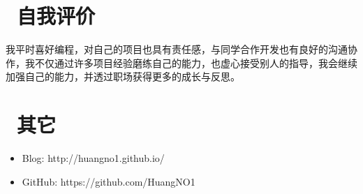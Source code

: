 \documentclass[11pt, a4paper]{article}
\begin{document}


\section{\color{CVBlue}\faChalkboard\ 自我评价}

\quad\quad 我平时喜好编程，对自己的项目也具有责任感，与同学合作开发也有良好的沟通协作，我不仅通过许多项目经验磨练自己的能力，也虚心接受别人的指导，我会继续加强自己的能力，并透过职场获得更多的成长与反思。

\section{\color{CVBlue}\faInfo\ 其它}
\begin{itemize}[parsep=0.5ex]
  \item Blog: http://huangno1.github.io/
  \item GitHub: https://github.com/HuangNO1
\end{itemize}
\end{document}
